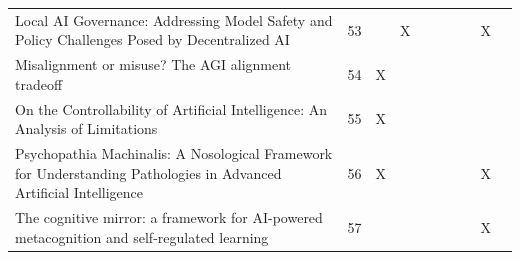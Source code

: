 \begin{landscape}
\begin{longtable}{|p{14cm}|c|c|c|c|c|c|c|c|c|}
		Local AI Governance: Addressing Model Safety and Policy Challenges Posed by Decentralized AI                                                            & 53          &                                    & X                                                         &                                                       &                                                            &                                           &                                              & X                                                  &                                    \\
		Misalignment or misuse? The AGI alignment tradeoff                                                                                                      & 54          & X                                  &                                                           &                                                       &                                                            &                                           &                                              &                                                    &                                    \\
		On the Controllability of Artificial Intelligence: An Analysis of Limitations                                                                           & 55          & X                                  &                                                           &                                                       &                                                            &                                           &                                              &                                                    &                                    \\
		Psychopathia Machinalis: A Nosological Framework for Understanding Pathologies in Advanced Artificial Intelligence                                      & 56          & X                                  &                                                           &                                                       &                                                            &                                           &                                              & X                                                  &                                    \\
		The cognitive mirror: a framework for AI-powered metacognition and self-regulated learning                                                              & 57          &                                    &                                                           &                                                       &                                                            &                                           &                                              & X                                                  &                                    \\

\end{longtable}
\end{landscape}
